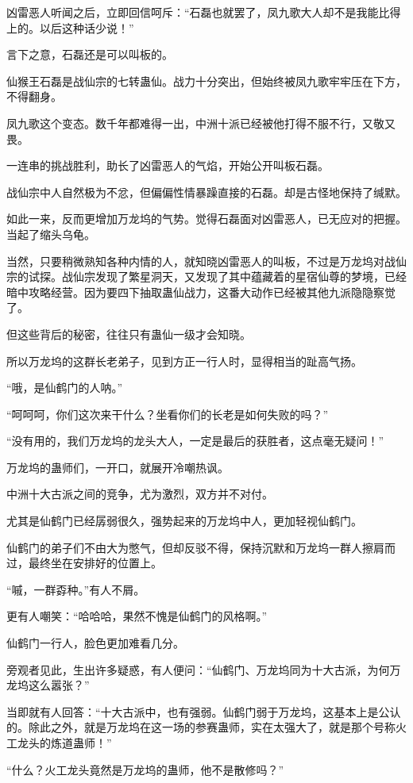 \begin{this_body}
凶雷恶人听闻之后，立即回信呵斥：“石磊也就罢了，凤九歌大人却不是我能比得上的。以后这种话少说！”

言下之意，石磊还是可以叫板的。

仙猴王石磊是战仙宗的七转蛊仙。战力十分突出，但始终被凤九歌牢牢压在下方，不得翻身。

凤九歌这个变态。数千年都难得一出，中洲十派已经被他打得不服不行，又敬又畏。

一连串的挑战胜利，助长了凶雷恶人的气焰，开始公开叫板石磊。

战仙宗中人自然极为不忿，但偏偏性情暴躁直接的石磊。却是古怪地保持了缄默。

如此一来，反而更增加万龙坞的气势。觉得石磊面对凶雷恶人，已无应对的把握。当起了缩头乌龟。

当然，只要稍微熟知各种内情的人，就知晓凶雷恶人的叫板，不过是万龙坞对战仙宗的试探。战仙宗发现了繁星洞天，又发现了其中蕴藏着的星宿仙尊的梦境，已经暗中攻略经营。因为要四下抽取蛊仙战力，这番大动作已经被其他九派隐隐察觉了。

但这些背后的秘密，往往只有蛊仙一级才会知晓。

所以万龙坞的这群长老弟子，见到方正一行人时，显得相当的趾高气扬。

“哦，是仙鹤门的人呐。”

“呵呵呵，你们这次来干什么？坐看你们的长老是如何失败的吗？”

“没有用的，我们万龙坞的龙头大人，一定是最后的获胜者，这点毫无疑问！”

万龙坞的蛊师们，一开口，就展开冷嘲热讽。

中洲十大古派之间的竞争，尤为激烈，双方并不对付。

尤其是仙鹤门已经孱弱很久，强势起来的万龙坞中人，更加轻视仙鹤门。

仙鹤门的弟子们不由大为憋气，但却反驳不得，保持沉默和万龙坞一群人擦肩而过，最终坐在安排好的位置上。

“嘁，一群孬种。”有人不屑。

更有人嘲笑：“哈哈哈，果然不愧是仙鹤门的风格啊。”

仙鹤门一行人，脸色更加难看几分。

旁观者见此，生出许多疑惑，有人便问：“仙鹤门、万龙坞同为十大古派，为何万龙坞这么嚣张？”

当即就有人回答：“十大古派中，也有强弱。仙鹤门弱于万龙坞，这基本上是公认的。除此之外，就是万龙坞在这一场的参赛蛊师，实在太强大了，就是那个号称火工龙头的炼道蛊师！”

“什么？火工龙头竟然是万龙坞的蛊师，他不是散修吗？”


\end{this_body}
